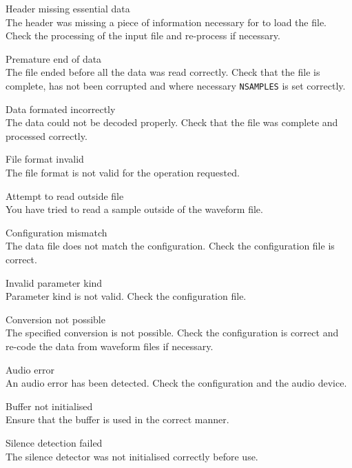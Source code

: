\begin{itemize}
\begin{itemize}
    Header missing essential data\\
        The header was missing a piece of information necessary for 
         to load the file.  Check the processing of the 
        input file and re-process if necessary.

    Premature end of data\\
        The file ended before all the data was read correctly.  Check that the
        file is complete, has not been corrupted and where necessary 
        \texttt{NSAMPLES} is set correctly.

    Data formated incorrectly\\
        The data could not be decoded properly.  Check that the file was 
        complete and processed correctly.

    File format invalid\\
        The file format is not valid for the operation requested.

    Attempt to read outside file\\
        You have tried to read a sample outside of the waveform file.

\end{itemize}


\begin{itemize}
    Configuration mismatch\\
        The data file does not match the configuration.  Check the 
        configuration file is correct.

    Invalid parameter kind\\
        Parameter kind is not valid.  Check the configuration file.

    Conversion not possible\\
        The specified conversion is not possible.  Check the configuration is
        correct and re-code the data from waveform files if necessary.

    Audio error\\
        An audio error has been detected.  Check the  
        configuration and the audio device.

    Buffer not initialised\\
        Ensure that the buffer is used in the correct manner.

    Silence detection failed\\
        The silence detector was not initialised correctly before use.


\end{itemize}
\end{itemize}
